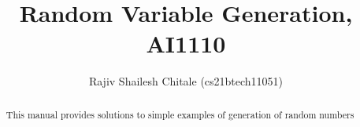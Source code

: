 \documentclass[journal,12pt,twocolumn]{IEEEtran}
\begin{document}
\newcommand{\mydet}[1]{\ensuremath{\begin{vmatrix}#1\end{vmatrix}}}
\newcommand*{\permcomb}[4][0mu]{{{}^{#3}\mkern#1#2_{#4}}}
\newcommand*{\perm}[1][-3mu]{\permcomb[#1]{P}}
\newcommand*{\comb}[1][-1mu]{\permcomb[#1]{C}}
%
\makeatletter
{}
\makeatother
\let\StandardTheFigure\thefigure
\let\vec\mathbf
\def\putbox#1#2#3{\makebox[0in][l]{\makebox[#1][l]{}\raisebox{\baselineskip}[0in][0in]{\raisebox{#2}[0in][0in]{#3}}}}
     \def\rightbox#1{\makebox[0in][r]{#1}}
     \def\centbox#1{\makebox[0in]{#1}}
     \def\topbox#1{\raisebox{-\baselineskip}[0in][0in]{#1}}
     \def\midbox#1{\raisebox{-0.5\baselineskip}[0in][0in]{#1}}
\vspace{3cm}
\title{Random Variable Generation, AI1110}
\author{Rajiv Shailesh Chitale (cs21btech11051)}	
\maketitle
\tableofcontents
\bigskip
\renewcommand{\thefigure}{\theenumi}
\renewcommand{\thetable}{\theenumi}
\begin{abstract}
This manual provides solutions to simple examples of generation of random numbers
\end{abstract}
%
\end{document}
